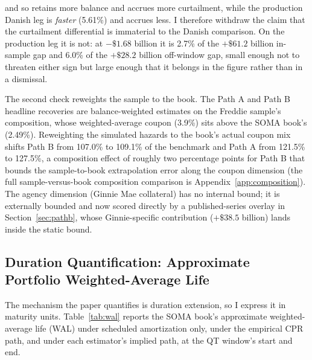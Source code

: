 \documentclass[12pt]{article}
\begin{document}
and so retains more balance and accrues more curtailment, while the production Danish leg is \emph{faster} (5.61\%) and accrues less. I therefore withdraw the claim that the curtailment differential is immaterial to the Danish comparison. On the production leg it is not: at $-\$1.68$ billion it is 2.7\% of the $+\$61.2$ billion in-sample gap and 6.0\% of the $+\$28.2$ billion off-window gap, small enough not to threaten either sign but large enough that it belongs in the figure rather than in a dismissal.

The second check reweights the sample to the book. The Path A and Path B headline recoveries are balance-weighted estimates on the Freddie sample's composition, whose weighted-average coupon (3.9\%) sits above the SOMA book's (2.49\%). Reweighting the simulated hazards to the book's actual coupon mix shifts Path B from 107.0\% to 109.1\% of the benchmark and Path A from 121.5\% to 127.5\%, a composition effect of roughly two percentage points for Path B that bounds the sample-to-book extrapolation error along the coupon dimension (the full sample-versus-book composition comparison is Appendix~\ref{app:composition}). The agency dimension (Ginnie Mae collateral) has no internal bound; it is externally bounded and now scored directly by a published-series overlay in Section~\ref{sec:pathb}, whose Ginnie-specific contribution ($+\$38.5$ billion) lands inside the static bound.

\subsection{Duration Quantification: Approximate Portfolio Weighted-Average Life}\label{sec:robustness-wal}

The mechanism the paper quantifies is duration extension, so I express it in maturity units. Table~\ref{tab:wal} reports the SOMA book's approximate weighted-average life (WAL) under scheduled amortization only, under the empirical CPR path, and under each estimator's implied path, at the QT window's start and end.
\end{document}
